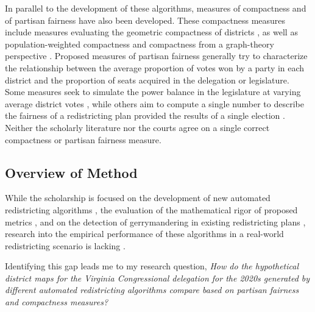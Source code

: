 In parallel to the development of these algorithms, measures of compactness and of partisan fairness have also been developed. These compactness measures include measures evaluating the geometric compactness of districts \parencite[e.g.][]{polsby1991, schwartzberg1966,harris1964, maceachren1985, reock1961, boyce1964}, as well as population-weighted compactness \parencite[e.g][]{fryer2007} and compactness from a graph-theory perspective \parencite[e.g.][]{dube2016}. Proposed measures of partisan fairness generally try to characterize the relationship between the average proportion of votes won by a party in each district and the proportion of seats acquired in the delegation or legislature. Some measures seek to simulate the power balance in the legislature at varying average district votes \parencite[e.g.][]{tufte1973}, while others aim to compute a single number to describe the fairness of a redistricting plan provided the results of a single election \parencite[e.g.][]{stephanopoulos2014,katz2020,warrington2018,mcdonald2015,wang2016}. Neither the scholarly literature nor the courts agree on a single correct compactness or partisan fairness measure. 

\subsection{Overview of Method}

While the scholarship is focused on the development of new automated redistricting algorithms \parencite{fifield2020},  the evaluation of the mathematical rigor of proposed metrics \parencite[see][]{katz2020}, and on the detection of gerrymandering in existing redistricting plans \parencite[e.g.][]{herschlag2017, duchin2018a}, research into the empirical performance of these algorithms in a real-world redistricting scenario is lacking \parencite{fifield2020a}.

Identifying this gap leads me to my research question, \emph{How do the hypothetical district maps for the Virginia Congressional delegation for the 2020s generated by different automated redistricting algorithms compare based on partisan fairness and compactness measures?}

